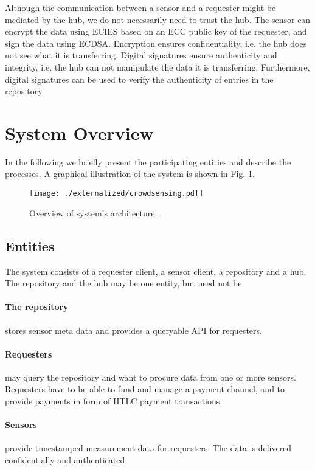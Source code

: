 Although the communication between a sensor and a requester might be mediated by the hub, we do not necessarily need to trust the hub. The sensor can encrypt the data using \ac{ECIES} based on an \ac{ECC} public key of the requester, and sign the data using \ac{ECDSA}. Encryption ensures confidentiality, i.e. the hub does not see what it is transferring. Digital signatures ensure authenticity and integrity, i.e. the hub can not manipulate the data it is transferring. 
Furthermore, digital signatures can be used to verify the authenticity of entries in the repository.

\section{System Overview}
\label{sec:trust-lessoverview}

In the following we briefly present the participating entities and describe the processes. A graphical illustration of the system is shown in Fig. \ref{fig:architecture}.

 \begin{figure}
 \texttt{[image: ./externalized/crowdsensing.pdf]}
 \caption{Overview of system's architecture.}
 \label{fig:architecture}
 \end{figure}

\subsection{Entities}

The system consists of a requester client, a sensor client, a repository and a hub. The repository and the hub may be one entity, but need not be. 

\paragraph{The repository} stores sensor meta data and provides a queryable \ac{API} for requesters.

\paragraph{Requesters} may query the repository and want to procure data from one or more sensors. Requesters have to be able to fund and manage a payment channel, and to provide payments in form of \ac{HTLC} payment transactions.

\paragraph{Sensors} provide timestamped measurement data for requesters. The data is delivered confidentially and authenticated.

